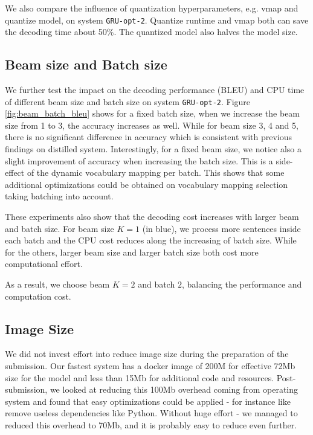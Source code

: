 \documentclass[11pt,a4paper]{article}
\begin{document}
We also compare the influence of quantization hyperparameters, e.g. vmap and quantize model, on system {\tt GRU-opt-2}.
Quantize runtime and vmap both can save the decoding time about 50\%.
The quantized model also halves the model size.

\subsection{Beam size and Batch size}

We further test the impact on the decoding performance (BLEU) and CPU
time of different beam size and batch size on system {\tt GRU-opt-2}.
Figure \ref{fig:beam_batch_bleu} shows for a fixed batch size, when we
increase the beam size from 1 to 3, the accuracy increases as well.
While for beam size 3, 4 and 5, there is no significant difference in
accuracy which is consistent with previous findings on distilled
system.  Interestingly, for a fixed beam size, we notice also a slight
improvement of accuracy when increasing the batch size. This is a
side-effect of the dynamic vocabulary mapping per batch. This shows
that some additional optimizations could be obtained on vocabulary
mapping selection taking batching into account.

%
These experiments also show that the decoding cost increases with
larger beam and batch size.  For beam size $K=1$ (in blue), we process
more sentences inside each batch and the CPU cost reduces along the
increasing of batch size.  While for the others, larger beam size and
larger batch size both cost more computational effort.

As a result,
we choose beam $K=2$ and batch $2$, balancing the performance and
computation cost.

%

\subsection{Image Size}

We did not invest effort into reduce image size during the preparation
of the submission. Our fastest system has a docker image of 200M for
effective 72Mb size for the model and less than 15Mb for additional
code and resources. Post-submission, we looked at reducing this 100Mb
overhead coming from operating system and found that easy
optimizations could be applied - for instance like remove useless
dependencies like Python. Without huge effort - we managed to reduced
this overhead to 70Mb, and it is probably easy to reduce even further.
\end{document}

